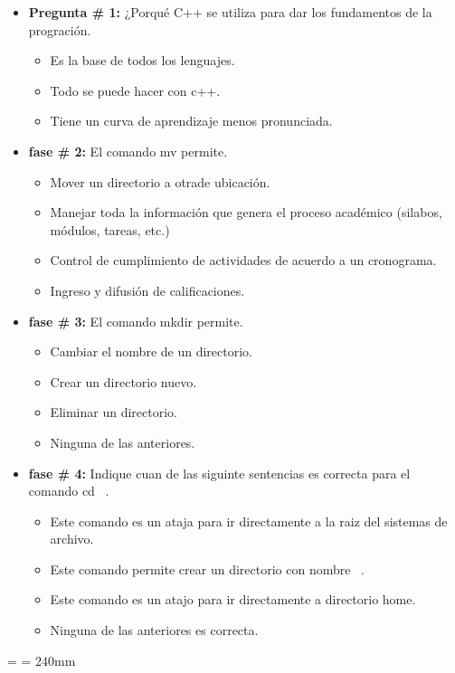 \documentclass[a4paper,12pt,spanish]{article}
\begin{document}
\begin{itemize}
\item \textbf{Pregunta \# 1:} ¿Porqué C++ se utiliza para dar los fundamentos de la progración.
  \begin{itemize}
  \item  Es la base de todos los lenguajes. 
  \item Todo se puede hacer con c++.
  \item Tiene un curva de aprendizaje menos pronunciada.
  \end{itemize}
\item \textbf{fase \# 2:} El comando mv permite.
  \begin{itemize}
  \item Mover un directorio a otrade ubicación.
  \item Manejar toda la información que genera el proceso académico (silabos, módulos, tareas, etc.)
  \item Control de cumplimiento de actividades de acuerdo a un cronograma.
  \item Ingreso y difusión de calificaciones.
  \end{itemize}
\item \textbf{fase \# 3:} El comando mkdir permite.
  \begin{itemize}
  \item Cambiar el nombre de un directorio. 
  \item Crear un directorio nuevo.
  \item Eliminar un directorio.
  \item Ninguna de las anteriores.
  \end{itemize}
\item \textbf{fase \# 4:} Indique cuan de las siguinte sentencias es correcta para el comando cd ~.
  \begin{itemize}
  \item  Este comando es un ataja para ir directamente a la raiz del sistemas de archivo.
  \item  Este comando permite crear un directorio con nombre  ~.
  \item  Este comando es un atajo para ir directamente a directorio home.
  \item Ninguna de las anteriores es correcta.
  \end{itemize}
\end{itemize}



\pdfpagewidth=297mm   %
\pdfpageheight=210mm %
\textwidth=250mm
\textheight=190mm
\headwidth=\textwidth
\linewidth= 240mm
\end{document}
